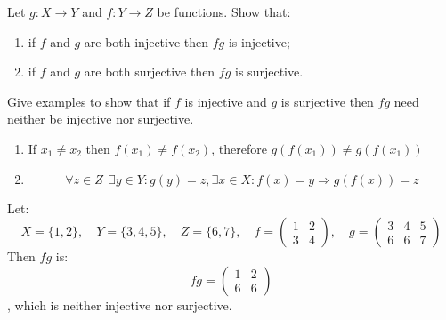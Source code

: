\begin{exercise}
    Let \(g : X \to Y\) and \(f : Y \to Z\) be functions. Show that:
    \begin{enumerate}
        \item if \(f\) and \(g\) are both injective then \(fg\) is injective;
        \item if \(f\) and \(g\) are both surjective then \(fg\) is surjective.
    \end{enumerate}

    Give examples to show that if \(f\) is injective and \(g\) is surjective then \(fg\) need
    neither be injective nor surjective.
\end{exercise}
\begin{solution}\itemfix
    \begin{enumerate}
        \item If \(x_1 \neq x_2\) then \(f(x_1) \neq f(x_2)\), therefore \(g(f(x_1)) \neq g(f(x_1))\)
        \item \[\forall z \in Z \ \ \exists y \in Y : g(y) = z, \exists x \in X : f(x) = y \Rightarrow g(f(x)) = z\]
    \end{enumerate}

    Let:
    \[X = \{1, 2\}, \quad Y = \{3, 4, 5\}, \quad Z = \{6, 7\}, \quad f = \begin{pmatrix} 1 & 2 \\ 3 & 4 \end{pmatrix}, \quad g = \begin{pmatrix} 3 & 4 & 5 \\ 6 & 6 & 7 \end{pmatrix}\]
    Then \(fg\) is:
    \[fg = \begin{pmatrix} 1 & 2 \\ 6 & 6 \end{pmatrix}\]
    , which is neither injective nor surjective.
\end{solution}

